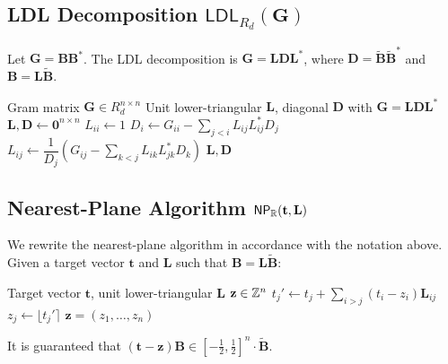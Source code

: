 \subsection{LDL Decomposition \texorpdfstring{$\mathsf{LDL}_{R_d}(\mathbf{G})$}{LDL\_Rd(G)}}

Let $\mathbf{G} = \mathbf{BB}^*$. The LDL decomposition is $\mathbf{G} = \mathbf{LDL}^*$, where $\mathbf{D} = \tilde{\mathbf{B}}\tilde{\mathbf{B}}^*$ and $\mathbf{B} = \mathbf{L\tilde B}$.

\begin{algorithm}[H]
	\caption{$\mathsf{LDL}_{R_d}(\mathbf{G} \in R_d^{n \times n})$}
	\label{alg:ldl-rd}
	\begin{algorithmic}[1]
		\Require Gram matrix $\mathbf{G} \in R_d^{n \times n}$
		\Ensure Unit lower-triangular $\mathbf{L}$, diagonal $\mathbf{D}$ with $\mathbf{G} = \mathbf{LDL}^*$
		\State $\mathbf{L}, \mathbf{D} \gets \mathbf{0}^{n \times n}$
			\State $L_{ii} \gets 1$
			\State $D_i \gets G_{ii} - \sum_{j < i} L_{ij} L_{ij}^* D_j$
				\State $L_{ij} \gets \dfrac{1}{D_j} \left( G_{ij} - \sum_{k < j} L_{ik} L_{jk}^* D_k \right)$
			\EndFor
		\EndFor
		\State \Return $\mathbf{L}, \mathbf{D}$
	\end{algorithmic}
\end{algorithm}

\subsection{Nearest-Plane Algorithm \texorpdfstring{$\mathsf{NP}_\R(\mathbf{t}, \mathbf{L})$}{NP\_R(t,L)}}

We rewrite the nearest-plane algorithm in accordance with the notation above. Given a target vector $\mathbf{t}$ and $\mathbf{L}$ such that $\mathbf{B} = \mathbf{L\tilde B}$:

\begin{algorithm}[H]
	\caption{$\mathsf{NP}_\R(\mathbf{t}, \mathbf{L})$}
	\label{alg:np-r}
	\begin{algorithmic}[1]
		\Require Target vector $\mathbf{t}$, unit lower-triangular $\mathbf{L}$
		\Ensure $\mathbf{z} \in \mathbb{Z}^n$
			\State $t_j' \gets t_j + \sum_{i>j} (t_i - z_i) \mathbf{L}_{ij}$
			\State $z_j \gets \lfloor t_j' \rceil$
		\EndFor
		\State \Return $\mathbf{z} = (z_1, \dots, z_n)$
	\end{algorithmic}
\end{algorithm}

It is guaranteed that $(\mathbf{t} - \mathbf{z}) \mathbf{B} \in \left[-\frac{1}{2}, \frac{1}{2}\right]^n \cdot \tilde{\mathbf{B}}$.

